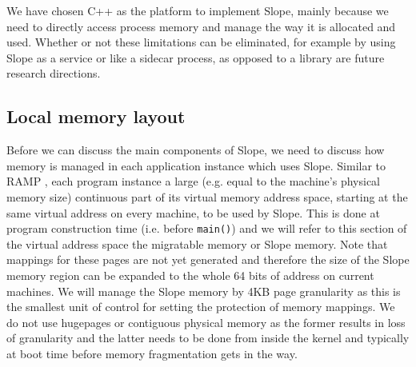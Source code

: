 We have chosen C++ as the platform to implement Slope, mainly because we need
to directly access process memory and manage the way it is allocated and used.
Whether or not these limitations can be eliminated, for example by using Slope
as a service or like a sidecar process, as opposed to a library are future
research directions.


\subsection{Local memory layout}
Before we can discuss the main components of Slope, we need to discuss how
memory is managed in each application instance which uses Slope. Similar to
RAMP \cite{memon2018ramp}, each program instance a
large   (e.g. equal to the machine's physical memory size) continuous part
of its virtual memory address space, starting at the same virtual address
on every machine, to be used by Slope.
This is done at program construction
time (i.e. before \texttt{main()}) and we will refer to this section of the virtual
address space the migratable memory or Slope memory. Note that mappings for
these pages are not yet generated and therefore the size of the Slope memory
region can be expanded to the whole 64 bits of address on current machines.
We will manage the Slope memory by 4KB page granularity as this is the
smallest unit of control for setting the protection of memory mappings.
We do not use 
hugepages or contiguous physical memory as the former results in
loss of granularity and the latter needs to be done from inside the kernel and
typically at boot time before memory fragmentation gets in the way.

